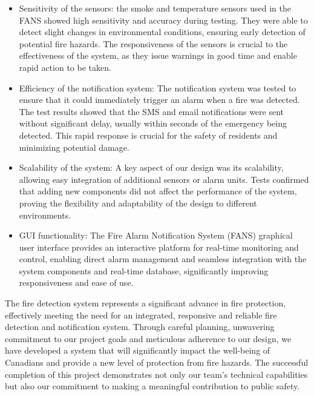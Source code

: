 \begin{itemize}
    \item Sensitivity of the sensors: the smoke and temperature sensors used in the FANS showed high sensitivity and accuracy during testing. They were able to detect slight changes in environmental conditions, ensuring early detection of potential fire hazards. The responsiveness of the sensors is crucial to the effectiveness of the system, as they issue warnings in good time and enable rapid action to be taken.
    \item Efficiency of the notification system: The notification system was tested to ensure that it could immediately trigger an alarm when a fire was detected. The test results showed that the SMS and email notifications were sent without significant delay, usually within seconds of the emergency being detected. This rapid response is crucial for the safety of residents and minimizing potential damage.
    \item Scalability of the system: A key aspect of our design was its scalability, allowing easy integration of additional sensors or alarm units. Tests confirmed that adding new components did not affect the performance of the system, proving the flexibility and adaptability of the design to different environments.
    \item GUI functionality: The Fire Alarm Notification System (FANS) graphical user interface provides an interactive platform for real-time monitoring and control, enabling direct alarm management and seamless integration with the system components and real-time database, significantly improving responsiveness and ease of use.
\end{itemize}

The fire detection system represents a significant advance in fire protection, effectively meeting the need for an
integrated, responsive and reliable fire detection and notification system. Through careful planning, unwavering
commitment to our project goals and meticulous adherence to our design, we have developed a system that will
significantly impact the well-being of Canadians and provide a new level of protection from fire hazards. The successful
completion of this project demonstrates not only our team's technical capabilities but also our commitment to making a
meaningful contribution to public safety.
